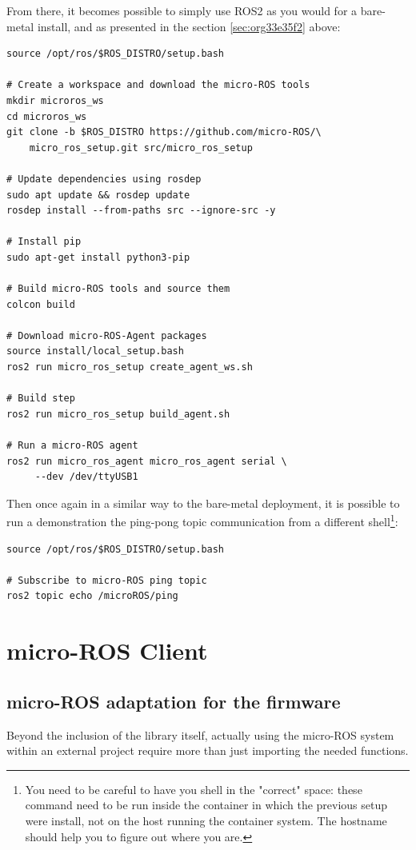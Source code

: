 \documentclass[10pt]{article}
\begin{document}
From there, it becomes possible to simply use ROS2 as you would for a bare-metal install,
and as presented in the section \ref{sec:org33e35f2} above:
\begin{verbatim}
source /opt/ros/$ROS_DISTRO/setup.bash

# Create a workspace and download the micro-ROS tools
mkdir microros_ws
cd microros_ws
git clone -b $ROS_DISTRO https://github.com/micro-ROS/\
    micro_ros_setup.git src/micro_ros_setup

# Update dependencies using rosdep
sudo apt update && rosdep update
rosdep install --from-paths src --ignore-src -y

# Install pip
sudo apt-get install python3-pip

# Build micro-ROS tools and source them
colcon build

# Download micro-ROS-Agent packages
source install/local_setup.bash
ros2 run micro_ros_setup create_agent_ws.sh

# Build step
ros2 run micro_ros_setup build_agent.sh

# Run a micro-ROS agent
ros2 run micro_ros_agent micro_ros_agent serial \
     --dev /dev/ttyUSB1
\end{verbatim}

Then once again in a similar way to the bare-metal deployment,  it is possible to run a demonstration
the ping-pong topic communication from a different shell\footnote{You need to be careful to have you shell in the "correct" space: these command need to be run inside
the container in which the previous setup were install, not on the host running the container system.
The hostname should help you to figure out where you are.}:
\begin{verbatim}
source /opt/ros/$ROS_DISTRO/setup.bash

# Subscribe to micro-ROS ping topic
ros2 topic echo /microROS/ping
\end{verbatim}
\clearpage
\section{micro-ROS Client}
\label{sec:orga8dca46}
\subsection{micro-ROS adaptation for the firmware}
\label{sec:orgba09cb5}
Beyond the inclusion of the library itself, actually using the micro-ROS system
within an external project require more than just importing the needed
functions.
\end{document}
